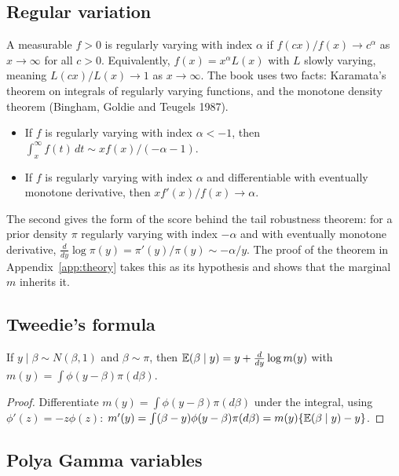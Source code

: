 \subsection{Regular variation}

A measurable $f > 0$ is regularly varying with index $\alpha$ if $f(cx)/f(x) \to c^{\alpha}$ as $x \to \infty$ for all $c > 0$. Equivalently, $f(x) = x^{\alpha}L(x)$ with $L$ slowly varying, meaning $L(cx)/L(x) \to 1$ as $x \to \infty$. The book uses two facts: Karamata's theorem on integrals of regularly varying functions, and the monotone density theorem (Bingham, Goldie and Teugels 1987).

\begin{itemize}
\item If $f$ is regularly varying with index $\alpha < -1$, then $\int_x^\infty f(t)\,dt \sim x f(x)/(-\alpha - 1)$.
\item If $f$ is regularly varying with index $\alpha$ and differentiable with eventually monotone derivative, then $x f'(x)/f(x) \to \alpha$.
\end{itemize}
The second gives the form of the score behind the tail robustness theorem: for a prior density $\pi$ regularly varying with index $-\alpha$ and with eventually monotone derivative, $\frac{d}{dy}\log \pi(y) = \pi'(y)/\pi(y) \sim -\alpha/y$. The proof of the theorem in Appendix~\ref{app:theory} takes this as its hypothesis and shows that the marginal $m$ inherits it.

\subsection{Tweedie's formula}

\begin{proposition}
If $y \mid \beta \sim N(\beta, 1)$ and $\beta \sim \pi$, then $\mathbb{E}(\beta \mid y) = y + \frac{d}{dy}\log m(y)$ with $m(y) = \int \phi(y - \beta)\pi(d\beta)$.
\end{proposition}

\begin{proof}
Differentiate $m(y) = \int\phi(y - \beta)\pi(d\beta)$ under the integral, using $\phi'(z) = -z\phi(z)$: $m'(y) = \int(\beta - y)\phi(y - \beta)\pi(d\beta) = m(y)\{\mathbb{E}(\beta \mid y) - y\}$.
\end{proof}

\subsection{Polya Gamma variables}

